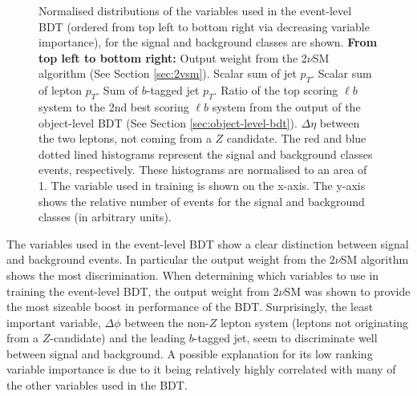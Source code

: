 \begin{figure}[h!]
    \caption{Normalised distributions of the variables used in the event-level BDT (ordered from top left to bottom right via decreasing variable importance), for the signal and background classes are shown. \textbf{From top left to bottom right:} Output weight from the 2$\nu$SM algorithm (See Section \ref{sec:2vsm}). Scalar sum of jet $p_{T}$. Scalar sum of lepton $p_{T}$. Sum of $b$-tagged jet $p_{T}$. Ratio of the top scoring $\ell b$ system to the 2nd best scoring $\ell b$ system from the output of the object-level BDT (See Section \ref{sec:object-level-bdt}). $\Delta \eta$ between the two leptons, not coming from a $Z$ candidate. The red and blue dotted lined histograms represent the signal and background classes events, respectively. These histograms are normalised to an area of 1. The variable used in training is shown on the x-axis. The y-axis shows the relative number of events for the signal and background classes (in arbitrary units). }
    \label{fig:norm-event-bdt-vars}
\end{figure}

The variables used in the event-level BDT show a clear distinction between signal and background events. In particular the output weight from the 2$\nu$SM algorithm shows the most discrimination. When determining which variables to use in training the event-level BDT, the output weight from 2$\nu$SM was shown to provide the most sizeable boost in performance of the BDT. Surprisingly, the least important variable, $\Delta \phi$ between the non-$Z$ lepton system (leptons not originating from a $Z$-candidate) and the leading $b$-tagged jet, seem to discriminate well between signal and background. A possible explanation for its low ranking variable importance is due to it being relatively highly correlated with many of the other variables used in the BDT.\\

